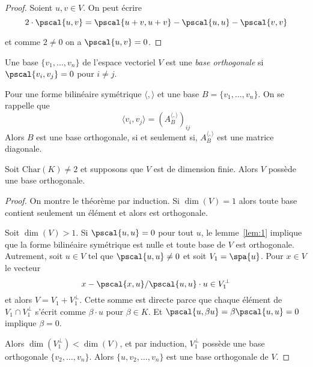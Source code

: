 \begin{proof}
  Soient $u,v \in V$. 
  On peut écrire
  \begin{displaymath}
   2 \cdot  \pscal{u,v} = \pscal{u+v,u+v} - \pscal{u,u} - \pscal{v,v} 
  \end{displaymath}

et comme $2 \neq 0$ on a $\pscal{u,v} = 0$. 
\end{proof}


\begin{definition}
  \label{def:38}
  Une base $\{v_1,\dots,v_n\}$
  de l'espace vectoriel $V$
  est une \emph{base orthogonale} si $\pscal{v_i,v_j}=0$
  pour $i\neq j$.
\end{definition}



\begin{remark}
  \label{rem:7}
  Pour une forme bilinéaire symétrique $\langle , \rangle$ et une base $B = \{v_1,\dots,v_n\}$. On se rappelle que 
  \begin{displaymath}
    〈v_i,v_j〉 = (A_B^{〈, 〉})_{ij}
  \end{displaymath}
  Alors $B$ est une base orthogonale, si et seulement si, $A_B^{\langle , \rangle}$ est une matrice diagonale.  
\end{remark}


\begin{theorem}
  \label{thr:5}
  Soit $\mathrm{Char}(K)\neq 2$
  et supposons que $V$
  est de dimension finie. Alors $V$ possède une base orthogonale.
\end{theorem}


\begin{proof}
  On montre le théorème par induction. Si $\dim(V) = 1$ alors toute base contient seulement un élément et alors est orthogonale. 

Soit $\dim(V) >1$.  Si $\pscal{u,u} = 0$ pour tout $u$, le lemme~\ref{lem:1} implique que la forme bilinéaire symétrique est nulle et toute base de $V$  est orthogonale.  
Autrement, soit $u \in V$ tel que $\pscal{u,u} \neq 0$ et soit $V_1 = \spa\{u\}$. Pour  $x \in V$ le vecteur 
\begin{displaymath}
  x - \pscal{x,u}/\pscal{u,u} \cdot  u \in V_1^\perp
\end{displaymath}
et alors $V = V_1 + V_1^\perp$. Cette somme est directe parce que chaque élément de $V_1 \cap V_1^\perp$ s'écrit comme $\beta \cdot u$ pour $\beta \in K$. Et $\pscal{u,\beta u} = \beta \pscal{u,u} = 0$ implique $\beta = 0$. 

Alors $\dim(V_1^\perp) < \dim(V)$, et par induction, $V_1^\perp$ possède une base orthogonale $\{v_2,\dots,v_n\}$. Alors $\{u,v_2,\dots,v_n\}$ est une base orthogonale de $V$. 
\end{proof}  



